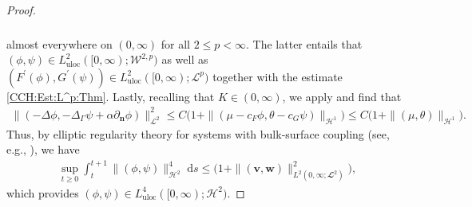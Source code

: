 \documentclass[10pt,reqno]{amsart}
\theoremstyle{remark}
\numberwithin{equation}{section}
\newcommand{\norm}[1]{\| #1 \|}
\newcommand{\n}{\mathbf{n}}
\newcommand{\bv}{\mathbf{v}}
\newcommand{\bw}{\mathbf{w}}
\newcommand{\ds}{\;\mathrm ds}
\newcommand{\deln}{\partial_\n}
\newcommand{\Lap}{\Delta}
\newcommand{\Lapg}{\Delta_\Ga}
\newcommand{\Ga}{\Gamma}
\begin{document}
\begin{proof}
\begin{align}
\begin{split}
        \end{split}
    \end{align}
    almost everywhere on $(0,\infty)$ for all $2 \leq p < \infty$. The latter entails that $(\phi,\psi)\in L^2_{\mathrm{uloc}}([0,\infty);\mathcal{W}^{2,p})$ as well as $(F^\prime(\phi),G^\prime(\psi))\in L^2_{\mathrm{uloc}}([0,\infty);\mathcal{L}^p)$ together with the estimate \eqref{CCH:Est:L^p:Thm}. Lastly, recalling that $K\in(0,\infty)$, we apply \cite[Corollary~5.4]{Giorgini2025} and find that
    \begin{align*}
        \norm{(-\Lap\phi,-\Lapg\psi + \alpha\deln\phi)}_{\mathcal{L}^2}^2 \leq C\big(1 + \norm{(\mu - c_F\phi,\theta - c_G\psi)}_{\mathcal{H}^1}\big) \leq C\big(1 + \norm{(\mu,\theta)}_{\mathcal{H}^1}\big).
    \end{align*}
    Thus, by elliptic regularity theory for systems with bulk-surface coupling (see, e.g., \cite[Theorem~3.3]{Knopf2021}), we have
    \begin{align*}
        \sup_{t\geq 0}\int_t^{t+1}\norm{(\phi,\psi)}_{\mathcal{H}^2}^4\ds \leq \big(1 + \norm{(\bv,\bw)}_{L^2(0,\infty;\mathbfcal{L}^2)}^2\big),
    \end{align*}
    which provides $(\phi,\psi)\in L^4_{\mathrm{uloc}}([0,\infty);\mathcal{H}^2)$. 
\end{proof}
\end{document}
